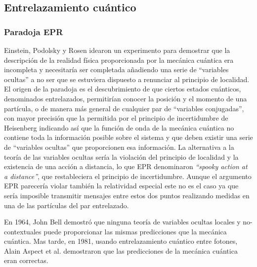 \documentclass{article}
\theoremstyle{plain}
\theoremstyle{definition}
\begin{document}
	\subsection{Entrelazamiento cuántico}
	\subsubsection{Paradoja EPR}
	Einstein, Podolsky y Rosen idearon un experimento \cite{Einstein:1935rr} para demostrar que la descripción de la realidad física proporcionada por la mecánica cuántica era incompleta y necesitaría ser completada añadiendo una serie de ``variables ocultas'' a no ser que se estuviera dispuesto a renunciar al principio de localidad. El origen de la paradoja es el descubrimiento de que ciertos estados cuánticos, denominados entrelazados, permitirían conocer la posición y el momento de una partícula, o de manera más general de cualquier par de ``variables conjugadas'', con mayor precisión que la permitida por el principio de incertidumbre de Heisenberg indicando así que la función de onda de la mecánica cuántica no contiene toda la información posible sobre el sistema y que deben existir una serie de ``variables ocultas'' que proporcionen esa información. La alternativa a la teoría de las variables ocultas sería la violación del principio de localidad y la existencia de una acción a distancia, lo que EPR denominaron \textit{``spooky action at a distance''}, que restableciera el principio de incertidumbre. Aunque el argumento EPR parecería violar también la relatividad especial este no es el caso ya que sería imposible transmitir mensajes entre estos dos puntos realizando medidas en una de las partículas del par entrelazado.\par En 1964, John Bell demostró \cite{Bell:1964kc} que ninguna teoría de variables ocultas locales y no-contextuales puede proporcionar las mismas predicciones que  la mecánica cuántica. Mas tarde, en 1981, usando entrelazamiento cuántico entre fotones, Alain Aspect et al. \cite{Aspect:1981zz} demostraron que las predicciones de la mecánica cuántica eran correctas.
\end{document}
